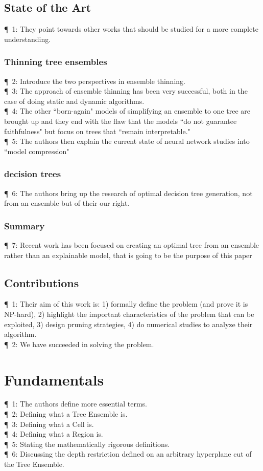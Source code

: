 \documentclass[11pt]{article}
\begin{document}
\subsection{State of the Art}
\P\, 1: They point towards other works that should be studied for a more complete understanding.
\subsubsection*{Thinning tree ensembles}
\P\, 2: Introduce the two perspectives in ensemble thinning.\\
\P\, 3: The approach of ensemble thinning has been very successful, both in the case of doing static and dynamic algorithms.\\
\P\, 4: The other ``born-again" models of simplifying an ensemble to one tree are brought up and they end with the flaw that the models ``do not guarantee faithfulness" but focus on trees that ``remain interpretable."\\
\P\, 5: The authors then explain the current state of neural network studies into ``model compression"
\subsubsection*{decision trees}
\P\, 6: The authors bring up the research of optimal decision tree generation, not from an ensemble but of their our right.
\subsubsection*{Summary}
\P\, 7: Recent work has been focused on creating an optimal tree from an ensemble rather than an explainable model, that is going to be the purpose of this paper
\subsection{Contributions}
\P\, 1: Their aim of this work is: 1) formally define the problem (and prove it is NP-hard), 2) highlight the important characteristics of the problem that can be exploited, 3) design pruning strategies, 4) do numerical studies to analyze their algorithm.\\
\P\, 2: We have succeeded in solving the problem.


\section{Fundamentals}
\P\, 1: The authors define more essential terms.\\
\P\, 2: Defining what a Tree Ensemble is.\\
\P\, 3: Defining what a Cell is.\\
\P\, 4: Defining what a Region is.\\
\P\, 5: Stating the mathematically rigorous definitions.\\
\P\, 6: Discussing the depth restriction defined on an arbitrary hyperplane cut of the Tree Ensemble.
\end{document}
